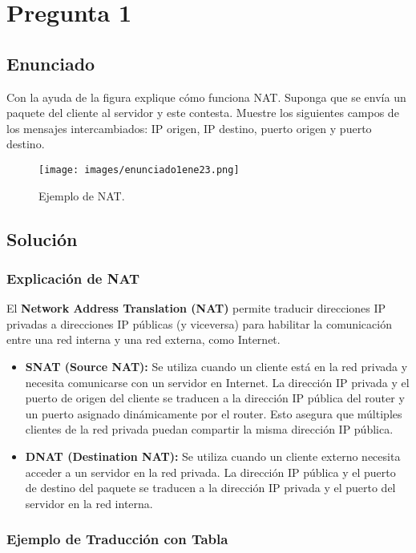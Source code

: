 \documentclass[12pt]{article}
\begin{document}
\section{Pregunta 1}

\subsection{Enunciado}

Con la ayuda de la figura explique cómo funciona NAT. Suponga que se envía un paquete del cliente al servidor y este contesta.
Muestre los siguientes campos de los mensajes intercambiados: IP origen, IP destino, puerto origen y puerto destino.

\begin{figure}[H]
    \centering
    \texttt{[image: images/enunciado1ene23.png]}
    \caption{Ejemplo de NAT.}
\end{figure}

\subsection{Solución}

\subsubsection{Explicación de NAT}
El \textbf{Network Address Translation (NAT)} permite traducir direcciones IP privadas a direcciones IP públicas (y viceversa) para habilitar la comunicación entre una red interna y una red externa, como Internet.

\begin{itemize}
    \item \textbf{SNAT (Source NAT):} 
    Se utiliza cuando un cliente está en la red privada y necesita comunicarse con un servidor en Internet. La dirección IP privada y el puerto de origen del cliente se traducen a la dirección IP pública del router y un puerto asignado dinámicamente por el router. Esto asegura que múltiples clientes de la red privada puedan compartir la misma dirección IP pública.
    \item \textbf{DNAT (Destination NAT):} 
    Se utiliza cuando un cliente externo necesita acceder a un servidor en la red privada. La dirección IP pública y el puerto de destino del paquete se traducen a la dirección IP privada y el puerto del servidor en la red interna.
\end{itemize}

\subsubsection{Ejemplo de Traducción con Tabla}
\end{document}
